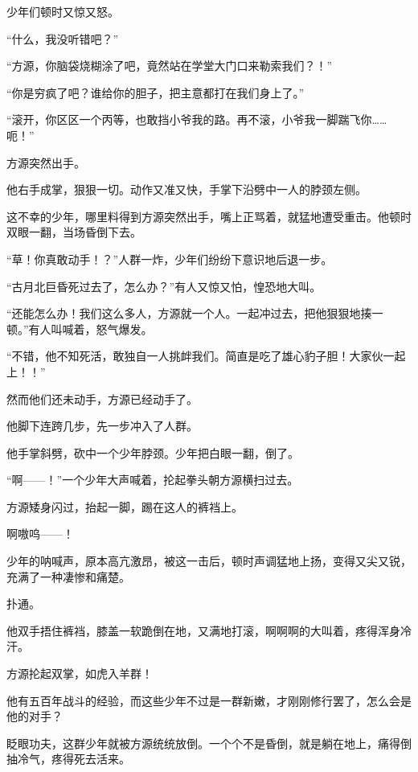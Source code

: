 
\begin{this_body}



少年们顿时又惊又怒。

“什么，我没听错吧？”

“方源，你脑袋烧糊涂了吧，竟然站在学堂大门口来勒索我们？！”

“你是穷疯了吧？谁给你的胆子，把主意都打在我们身上了。”

“滚开，你区区一个丙等，也敢挡小爷我的路。再不滚，小爷我一脚踹飞你……呃！”

方源突然出手。

他右手成掌，狠狠一切。动作又准又快，手掌下沿劈中一人的脖颈左侧。

这不幸的少年，哪里料得到方源突然出手，嘴上正骂着，就猛地遭受重击。他顿时双眼一翻，当场昏倒下去。

“草！你真敢动手！？”人群一炸，少年们纷纷下意识地后退一步。

“古月北巨昏死过去了，怎么办？”有人又惊又怕，惶恐地大叫。

“还能怎么办！我们这么多人，方源就一个人。一起冲过去，把他狠狠地揍一顿。”有人叫喊着，怒气爆发。

“不错，他不知死活，敢独自一人挑衅我们。简直是吃了雄心豹子胆！大家伙一起上！！”

然而他们还未动手，方源已经动手了。

他脚下连跨几步，先一步冲入了人群。

他手掌斜劈，砍中一个少年脖颈。少年把白眼一翻，倒了。

“啊——！”一个少年大声喊着，抡起拳头朝方源横扫过去。

方源矮身闪过，抬起一脚，踢在这人的裤裆上。

啊嗷呜——！

少年的呐喊声，原本高亢激昂，被这一击后，顿时声调猛地上扬，变得又尖又锐，充满了一种凄惨和痛楚。

扑通。

他双手捂住裤裆，膝盖一软跪倒在地，又满地打滚，啊啊啊的大叫着，疼得浑身冷汗。

方源抡起双掌，如虎入羊群！

他有五百年战斗的经验，而这些少年不过是一群新嫩，才刚刚修行罢了，怎么会是他的对手？

眨眼功夫，这群少年就被方源统统放倒。一个个不是昏倒，就是躺在地上，痛得倒抽冷气，疼得死去活来。


\end{this_body}
